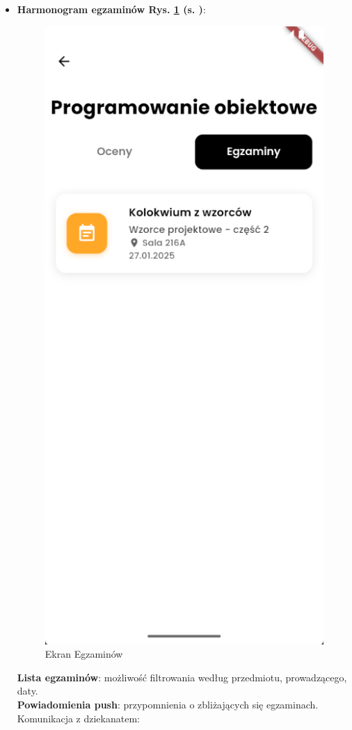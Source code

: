 \begin{itemize}
      \item \textbf{Harmonogram egzaminów Rys. \ref{rys:ekranegzaminow} (s. \pageref{rys:ekranegzaminow})}:
            \begin{figure}[htb!]
                  \centering
                  \includegraphics[width=0.55\linewidth]{rys/ekranegzaminow.png}
                  \caption{Ekran Egzaminów}
                  \label{rys:ekranegzaminow}
            \end{figure}
            \newpage
            \textbf{Lista egzaminów}: możliwość filtrowania według przedmiotu, prowadzącego, daty.
            \\\textbf{Powiadomienia push}: przypomnienia o zbliżających się egzaminach.
            Komunikacja z dziekanatem:


\end{itemize}
